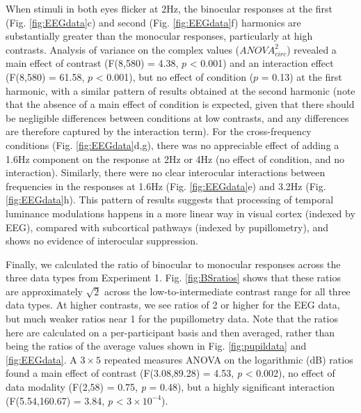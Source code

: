 \documentclass[
]{article}
\begin{document}
When stimuli in both eyes flicker at 2Hz, the binocular responses at the first (Fig. \ref{fig:EEGdata}c) and second (Fig. \ref{fig:EEGdata}f) harmonics are substantially greater than the monocular responses, particularly at high contrasts. Analysis of variance on the complex values (\(ANOVA^2_{circ}\)) revealed a main effect of contrast (F(8,580) = 4.38, \(p\) \textless{} 0.001) and an interaction effect (F(8,580) = 61.58, \(p\) \textless{} 0.001), but no effect of condition (\(p\) = 0.13) at the first harmonic, with a similar pattern of results obtained at the second harmonic (note that the absence of a main effect of condition is expected, given that there should be negligible differences between conditions at low contrasts, and any differences are therefore captured by the interaction term). For the cross-frequency conditions (Fig. \ref{fig:EEGdata}d,g), there was no appreciable effect of adding a 1.6Hz component on the response at 2Hz or 4Hz (no effect of condition, and no interaction). Similarly, there were no clear interocular interactions between frequencies in the responses at 1.6Hz (Fig. \ref{fig:EEGdata}e) and 3.2Hz (Fig. \ref{fig:EEGdata}h). This pattern of results suggests that processing of temporal luminance modulations happens in a more linear way in visual cortex (indexed by EEG), compared with subcortical pathways (indexed by pupillometry), and shows no evidence of interocular suppression.

Finally, we calculated the ratio of binocular to monocular responses across the three data types from Experiment 1. Fig. \ref{fig:BSratios} shows that these ratios are approximately \(\sqrt2\) across the low-to-intermediate contrast range for all three data types. At higher contrasts, we see ratios of 2 or higher for the EEG data, but much weaker ratios near 1 for the pupillometry data. Note that the ratios here are calculated on a per-participant basis and then averaged, rather than being the ratios of the average values shown in Fig. \ref{fig:pupildata} and \ref{fig:EEGdata}. A \(3 \times 5\) repeated measures ANOVA on the logarithmic (dB) ratios found a main effect of contrast (F(3.08,89.28) = 4.53, \emph{p} \textless{} 0.002), no effect of data modality (F(2,58) = 0.75, \emph{p} = 0.48), but a highly significant interaction (F(5.54,160.67) = 3.84, \emph{p} \textless{} \ensuremath{3\times 10^{-4}}).
\end{document}
